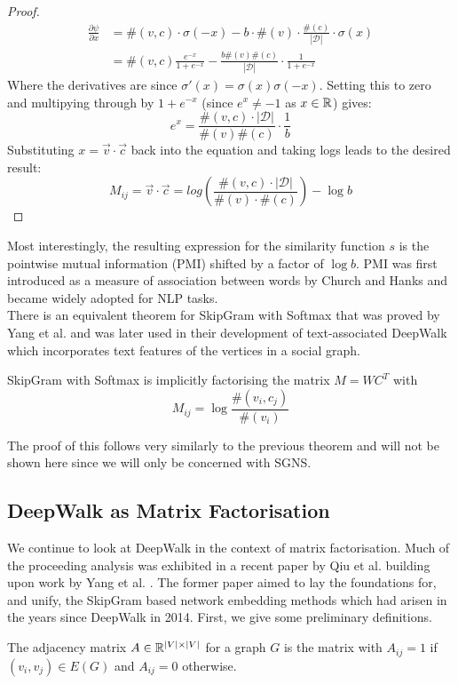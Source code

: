 \documentclass[a4paper]{article}
\newcommand{\D}{\mathcal D}
\begin{document}
\begin{proof}
\begin{align*}
  \frac{\partial{\psi}}{\partial{x}} &= \#(v, c) \cdot \sigma(-x) - b \cdot
    \#(v) \cdot \frac{\#(c)}{|\D|} \cdot \sigma(x)\\
    &= \#(v,c)\frac{e^{-x}}{1+e^{-x}} -\frac{b\#(v)\#(c)}{|\D|} \cdot \frac{1}{1+e^{-x}}
  \end{align*}
  Where the derivatives are since $\sigma'(x) = \sigma(x)\sigma(-x)$. Setting
  this to zero and multipying through by
  $1+e^{-x}$ (since $e^{x} \neq -1$ as $x \in \R$) gives:
  \[e^x = \frac{\#(v,c) \cdot |\D|}{\#(v)\#(c)} \cdot \frac{1}{b}\]
  Substituting $x = \vec{v} \cdot \vec{c}$ back into the equation and taking
  logs leads to the desired result:
  \[M_{ij} = \vec{v} \cdot \vec{c} = log{\left( \frac{\#(v, c) \cdot |\D|}{\#(v) \cdot
          \#(c)} \right)} - \log{b}\]
\end{proof}
\noindent Most interestingly, the resulting expression for the similarity function $s$ is
the pointwise mutual information (PMI) shifted by a factor of $\log b$. PMI was
first introduced as a measure of association between words by Church and Hanks
\cite{church1990} and became widely adopted for NLP tasks.\\
There is an equivalent theorem for SkipGram with Softmax that was proved by Yang
et al. \cite{yangalternative2015} and was later used in their development of
text-associated DeepWalk \cite{yang2015} which incorporates text features
of the vertices in a social graph.

\begin{theorem}[Yang et al. (2015)]
  SkipGram with Softmax is implicitly factorising the matrix $M = WC^T$ with
  \[M_{ij} = \log{\frac{\#(v_i,c_j)}{\#(v_i)}}\]
\end{theorem}
The proof of this follows very similarly to the previous theorem and will not be
shown here since we will only be concerned with SGNS.

\subsection{DeepWalk as Matrix Factorisation}
We continue to look at DeepWalk in the context of matrix factorisation. Much of the proceeding analysis was exhibited in a recent paper by Qiu et
al. \cite{qiu2018} building upon work by Yang et al. \cite{yang2015}. The former paper aimed to lay the foundations for, and
unify, the SkipGram based network embedding methods which had arisen in the years since DeepWalk in 2014. First, we give some preliminary definitions.
\begin{definition}
  The adjacency matrix $A \in \R^{|V| \times |V|}$ for a graph $G$ is the matrix with $A_{ij} = 1$ if $(v_i, v_j) \in E(G)$ and $A_{ij} = 0$ otherwise.
\end{definition}
\end{document}

